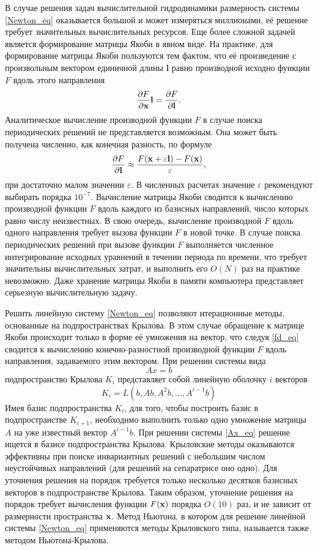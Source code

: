 \def\l{\mathbf{l}}
В случае решения задач вычислительной гидродинамики размерность системы \eqref{Newton_eq} оказывается большой и может измеряться миллионами, её решение требует значительных вычислительных ресурсов. Еще более сложной задачей является формирование матрицы Якоби в явном виде. На практике, для формирование матрицы Якоби пользуются тем фактом, что её произведение с произвольным вектором единичной длины $\l$ равно производной исходно функции $F$ вдоль этого направления
\begin{equation} \label{Jl_eq}
\pd{F}{\x} \l = \pd{F}{\l}. 
\end{equation}
Аналитическое вычисление производной функции $F$ в случае поиска периодических решений не представляется возможным. 
Она может быть получена численно, как конечная разность, по формуле
\begin{equation}\label{fd_eq}
\pd{F}{\l} \approx \frac{F(\x + \varepsilon \l) - F(\x)}{\varepsilon},
\end{equation}
при достаточно малом значении $\varepsilon$. В численных расчетах значение $\varepsilon$ рекомендуют выбирать порядка $10^{-7}$. Вычисление матрицы Якоби сводится к вычислению производной функции $F$ вдоль каждого из базисных направлений, число которых равно числу неизвестных. В свою очередь, вычисление производной $F$ вдоль одного направления требует вызова функции $F$ в новой точке. В случае поиска периодических решений при вызове функции $F$ выполняется численное интегрирование исходных уравнений в течении периода по времени, что требует значительны вычислительных затрат, и выполнить его $O(N)$ раз на практике невозможно. Даже хранение матрицы Якоби в памяти компьютера представляет серьезную вычислительную задачу.

Решить линейную систему \eqref{Newton_eq} позволяют итерационные методы, основанные на подпространствах Крылова. В этом случае обращение к матрице Якоби происходит только в форме её умножения на вектор, что следуя \eqref{fd_eq} сводится к вычислению конечно-разностной производной функции $F$ вдоль направления, задаваемого этим вектором. При решении системы вида 
\begin{equation}\label{Ax_eq}
Ax = b
\end{equation}
подпространство Крылова $K_i$ представляет собой линейную оболочку $i$ векторов
$$
K_i = L(b, Ab, A^2b, \dots, A^{i-1}b)
$$ 
Имея базис подпространства $K_i$, для того, чтобы построить базис в подпространстве $K_{i+1}$, необходимо выполнить только одно умножение матрицы $A$ на уже известный вектор $A^{i-1}b$. При решении системы \eqref{Ax_eq} решение ищется в базисе подпространства Крылова. Крыловские методы оказываются эффективны при поиске инвариантных решений с небольшим числом неустойчивых направлений (для решений на сепаратрисе оно одно). Для уточнения решения на порядок требуется только несколько десятков базисных векторов в подпространстве Крылова. Таким образом, уточнение решения на порядок требует вычисления функции $F(\mathbf{x})$ порядка $O(10)$ раз, и не зависит от размерности пространства $\mathbf{x}$. Метод Ньютона, в котором для решение линейной системы \eqref{Newton_eq} применяются методы Крыловского типа, называется также методом Ньютона-Крылова. 


